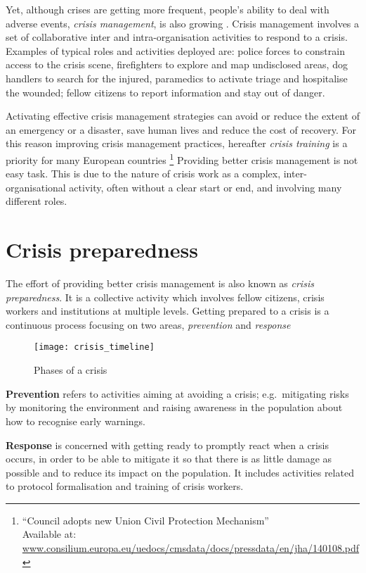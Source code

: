 Yet, although crises are getting more frequent, people's ability to deal with adverse events, \emph{crisis management}, is also growing \autocite{Boin:2009bv}. Crisis management involves a set of collaborative inter and intra-organisation activities to respond to a crisis. Examples of typical roles and activities deployed are: police forces to constrain access to the crisis scene, firefighters to explore and map undisclosed areas, dog handlers to search for the injured, paramedics to activate triage and hospitalise the wounded; fellow citizens to report information and stay out of danger.

Activating effective crisis management strategies can avoid or reduce the extent of an emergency or a disaster, save human lives and reduce the cost of recovery. For this reason improving crisis management practices, hereafter \emph{crisis training} is a priority for many European countries \footnote{``Council adopts new Union Civil Protection Mechanism'' \\ Available at: \url{www.consilium.europa.eu/uedocs/cmsdata/docs/pressdata/en/jha/140108.pdf}} Providing better crisis management is not easy task. This is due to the nature of crisis work as a complex, inter-organisational activity, often without a clear start or end, and involving many different roles.

\section{Crisis preparedness}\label{crisis-preparedness}

The effort of providing better crisis management is also known as \emph{crisis preparedness}. It is a collective activity which involves fellow citizens, crisis workers and institutions at multiple levels. Getting prepared to a crisis is a continuous process focusing on two areas, \emph{prevention} and \emph{response} \autocite{Deverell:2009fk}

\begin{figure}
	[h!] \centering 
	\texttt{[image: crisis\_timeline]} 
	\caption{Phases of a crisis} \label{fig:phases} 
\end{figure}

\textbf{Prevention} refers to activities aiming at avoiding a crisis; e.g.~mitigating risks by monitoring the environment and raising awareness in the population about how to recognise early warnings.

\textbf{Response} is concerned with getting ready to promptly react when a crisis occurs, in order to be able to mitigate it so that there is as little damage as possible and to reduce its impact on the population. It includes activities related to protocol formalisation and training of crisis workers.


